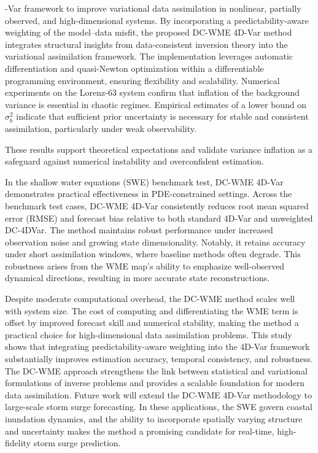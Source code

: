 \documentclass[final,1p,times]{elsarticle}
\begin{document}
-Var framework to improve variational data assimilation in nonlinear, partially observed, and high-dimensional systems. 
By incorporating a predictability-aware weighting of the model–data misfit, the proposed DC-WME 4D-Var method integrates structural insights from data-consistent inversion theory into the variational assimilation framework. 
The implementation leverages automatic differentiation and quasi-Newton optimization within a differentiable programming environment, ensuring flexibility and scalability. 
Numerical experiments on the Lorenz-63 system confirm that inflation of the background variance is essential in chaotic regimes. 
Empirical estimates of a lower bound on $\sigma_b^2$ indicate that sufficient prior uncertainty is necessary for stable and consistent assimilation, particularly under weak observability. 


These results support theoretical expectations and validate variance inflation as a safeguard against numerical instability and overconfident estimation.

In the shallow water equations (SWE) benchmark test, DC-WME 4D-Var demonstrates practical effectiveness in PDE-constrained settings. 
Across the benchmark test cases, DC-WME 4D-Var consistently reduces root mean squared error (RMSE) and forecast bias relative to both standard 4D-Var and unweighted DC-4DVar. 
The method maintains robust performance under increased observation noise and growing state dimensionality. 
Notably, it retains accuracy under short assimilation windows, where baseline methods often degrade. 
This robustness arises from the WME map’s ability to emphasize well-observed dynamical directions, resulting in more accurate state reconstructions. 

Despite moderate computational overhead, the DC-WME method scales well with system size. 
The cost of computing and differentiating the WME term is offset by improved forecast skill and numerical stability, making the method a practical choice for high-dimensional data assimilation problems. 
This study shows that integrating predictability-aware weighting into the 4D-Var framework substantially improves estimation accuracy, temporal consistency, and robustness. 
The DC-WME approach strengthens the link between statistical and variational formulations of inverse problems and provides a scalable foundation for modern data assimilation. 
Future work will extend the DC-WME 4D-Var methodology to large-scale storm surge forecasting. 
In these applications, the SWE govern coastal inundation dynamics, and the ability to incorporate spatially varying structure and uncertainty makes the method a promising candidate for real-time, high-fidelity storm surge prediction.
\end{document}
